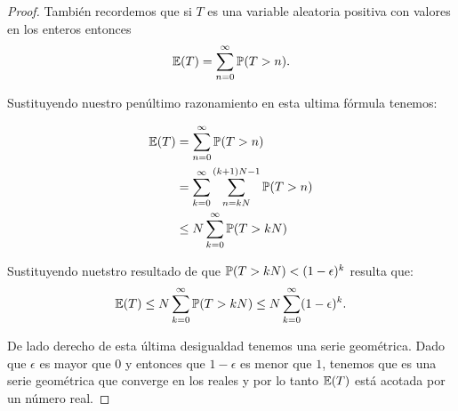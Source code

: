 \begin{proof}
	También recordemos que si $T$ es una variable aleatoria positiva con valores en los enteros entonces 
	\begin{align}
		\mathbb{E}(T) = \sum_{n=0}^{\infty} \mathbb{P}(T > n).
	\end{align}
	
	Sustituyendo nuestro penúltimo razonamiento en esta ultima fórmula tenemos:
	
	\begin{align}
		\mathbb{E}(T) 	&= 		\sum_{n=0}^{\infty} \mathbb{P}(T > n) \\
				&= 		\sum_{k=0}^{\infty} \sum_{n = kN}^{(k+1)N -1} \mathbb{P}(T > n) \\
				&\leq 	N \sum_{k=0}^{\infty} \mathbb{P}(T > kN)
	\end{align}
		
	Sustituyendo nuetstro resultado de que $\mathbb{P}(T>kN)<(1-\epsilon)^{k}$ resulta que:
	$$\mathbb{E}(T)\leq N \sum_{k=0}^{\infty} \mathbb{P}(T > kN) \leq N \sum_{k=0}^{\infty} (1-\epsilon)^k.$$
	
	De lado derecho de esta última desigualdad tenemos una serie geométrica. Dado que $\epsilon$ es mayor 
	que $0$ y entonces que $1-\epsilon$ es menor que $1$, tenemos que es una serie geométrica que converge 
	en los reales y por lo tanto $\mathbb{E}(T)$ está acotada por un número real.
	
\end{proof}	